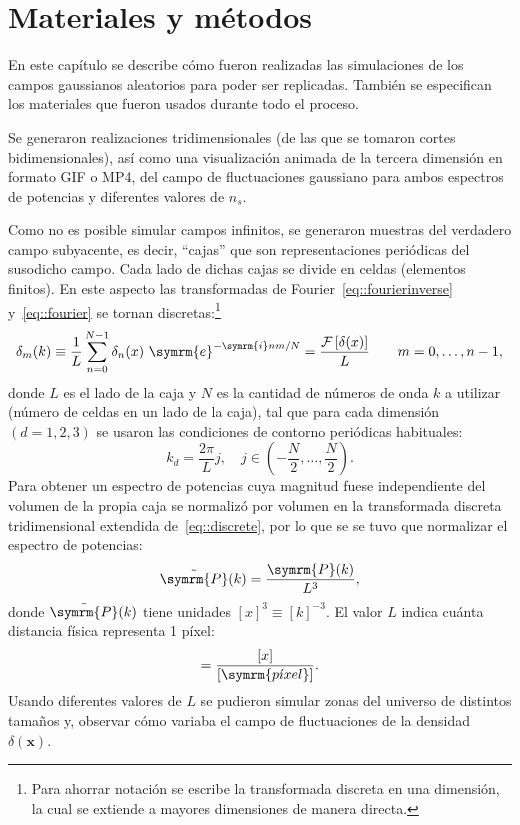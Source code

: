 \chapter{Materiales y métodos}\label{ch::mym}
En este capítulo se describe cómo fueron realizadas las simulaciones de los campos gaussianos aleatorios para poder ser replicadas. También se especifican los materiales que fueron usados durante todo el proceso.

Se generaron realizaciones tridimensionales (de las que se tomaron cortes bidimensionales), así como una visualización animada de la tercera dimensión en formato GIF o MP4, del campo de fluctuaciones gaussiano para ambos espectros de potencias y diferentes valores de \(n_s\).

Como no es posible simular campos infinitos, se generaron muestras del verdadero campo subyacente, es decir, ``cajas'' que son representaciones periódicas del susodicho campo. Cada lado de dichas cajas se divide en celdas (elementos finitos). En este aspecto las transformadas de Fourier~\eqref{eq::fourierinverse} y~\eqref{eq::fourier} se tornan discretas:\footnote{Para ahorrar notación se escribe la transformada discreta en una dimensión, la cual se extiende a mayores dimensiones de manera directa.}
\begin{equation}
    \delta_m(k)\equiv\frac{1}{L}\sum_{n=0}^{N-1}\delta_n(x)\ \symrm{e}^{-\symrm{i}nm/N}=\frac{\mathcal{F}\left[\delta({x})\right]}{L}\qquad m=0,\ldots,n-1,\label{eq::discrete}
\end{equation}
donde \(L\) es el lado de la caja y \(N\) es la cantidad de números de onda \(k\) a utilizar (número de celdas en un lado de la caja), tal que para cada dimensión \((d=1,2,3)\) se usaron las condiciones de contorno periódicas habituales:
\begin{equation}
    k_d=\frac{2\pi}{L}j,\quad j\in\left(-\frac{N}{2},\ldots,\frac{N}{2}\right).\label{eq::knumbers}
\end{equation}
Para obtener un espectro de potencias cuya magnitud fuese independiente del volumen de la propia caja se normalizó por volumen en la transformada discreta tridimensional extendida de~\eqref{eq::discrete}, por lo que se se tuvo que normalizar el espectro de potencias:
\begin{equation}
    \tilde{\symrm{P}}(k)=\frac{\symrm{P}(k)}{L^3},
\end{equation}
donde \(\tilde{\symrm{P}}(k)\) tiene unidades \([x]^3\equiv[k]^{-3}\). El valor \(L\) indica cuánta distancia física representa 1 píxel:
\begin{equation}
    [L]=\frac{[x]}{[\symrm{p\acute{\imath}xel}]}.
\end{equation}
Usando diferentes valores de \(L\) se pudieron simular zonas del universo de distintos tamaños y, observar cómo variaba el campo de fluctuaciones de la densidad \(\delta(\symbf{x})\).
